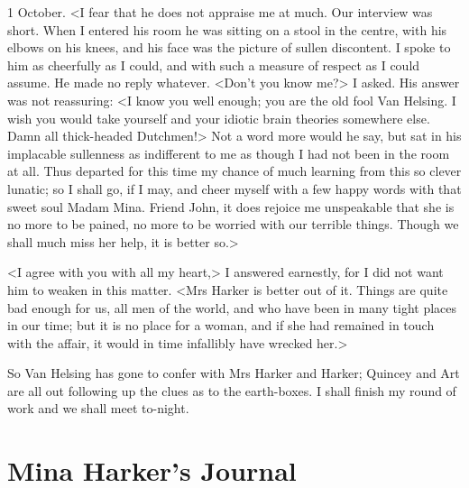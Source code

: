 \begin{diary}{1 October.}
<I fear that he does not appraise me at much. Our interview was short. When I entered his room he was sitting on a stool in the centre, with his elbows on his knees, and his face was the picture of sullen discontent. I spoke to him as cheerfully as I could, and with such a measure of respect as I could assume. He made no reply whatever. <Don't you know me?> I asked. His answer was not reassuring: <I know you well enough; you are the old fool Van Helsing. I wish you would take yourself and your idiotic brain theories somewhere else. Damn all thick-headed Dutchmen!> Not a word more would he say, but sat in his implacable sullenness as indifferent to me as though I had not been in the room at all. Thus departed for this time my chance of much learning from this so clever lunatic; so I shall go, if I may, and cheer myself with a few happy words with that sweet soul Madam Mina. Friend John, it does rejoice me unspeakable that she is no more to be pained, no more to be worried with our terrible things. Though we shall much miss her help, it is better so.>

<I agree with you with all my heart,> I answered earnestly, for I did not want him to weaken in this matter. <Mrs Harker is better out of it. Things are quite bad enough for us, all men of the world, and who have been in many tight places in our time; but it is no place for a woman, and if she had remained in touch with the affair, it would in time infallibly have wrecked her.>

So Van Helsing has gone to confer with Mrs Harker and Harker; Quincey and Art are all out following up the clues as to the earth-boxes. I shall finish my round of work and we shall meet to-night.
\end{diary}

\section{Mina Harker's Journal}

